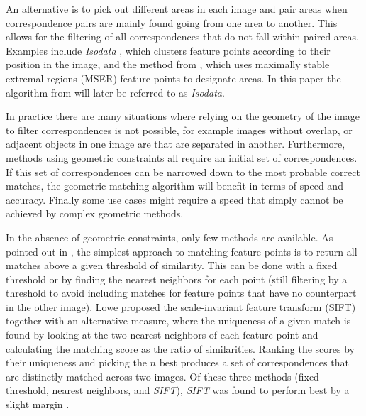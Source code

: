 \documentclass[conference]{IEEEtran}
\begin{document}
%
An alternative is to pick out different areas in each image and pair 
areas when correspondence pairs are mainly found going from one area to 
another. This allows for the filtering of all correspondences that do 
not fall within paired areas. Examples include \emph{Isodata} 
\cite{das2008event}, which clusters feature points according to their 
position in the image, and the method from \cite{wu2011robust}, which 
uses maximally stable extremal regions (MSER) feature points to 
designate areas. In this paper the algorithm from \cite{das2008event} 
will later be referred to as \emph{Isodata}.


In practice there are many situations where relying on the geometry of 
the image to filter correspondences is not possible, for example images 
without overlap, or adjacent objects in one image are that are separated 
in another.  Furthermore, methods using geometric constraints all 
require an initial set of correspondences. If this set of 
correspondences can be narrowed down to the most probable correct 
matches, the geometric matching algorithm will benefit in terms of speed 
and accuracy.  Finally some use cases might require a speed that simply 
cannot be achieved by complex geometric methods.

In the absence of geometric constraints, only few methods are available.  
As pointed out in \cite{szeliski2010}, the simplest approach to matching 
feature points is to return all matches above a given threshold of 
similarity.  This can be done with a fixed threshold or by finding the 
nearest neighbors for each point (still filtering by a threshold to 
avoid including matches for feature points that have no counterpart in 
the other image).  Lowe \cite{lowe2004sift} proposed the scale-invariant 
feature transform (SIFT) together with an alternative measure, where the 
uniqueness of a given match is found by looking at the two nearest 
neighbors of each feature point and calculating the matching score as 
the ratio of similarities.  Ranking the scores by their uniqueness and 
picking the $n$ best produces a set of correspondences that are 
distinctly matched across two images.
Of these three methods (fixed threshold, nearest neighbors, and 
\emph{SIFT}), \emph{SIFT} was found to perform best by a slight margin 
\cite{mikolajczyk2005performance}.
\end{document}
